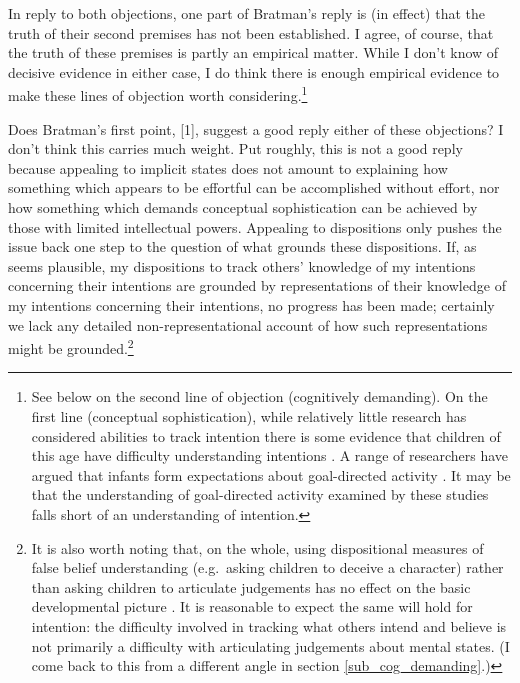 \documentclass[12pt,letterpaper]{extarticle}
\begin{document}
In reply to both objections, one part of Bratman's reply is (in effect) that the truth of their second premises has not been established.
I agree, of course, that the truth of these premises is partly an empirical matter.
While I don't know of decisive evidence in either case, I do think there is enough empirical evidence to make these lines of objection worth considering.\footnote{
See below on the second line of objection (cognitively demanding).
On the first line (conceptual sophistication), while relatively little research has considered abilities to track intention there is some evidence that children of this age have difficulty understanding intentions \citep{Astington:1991jp,Astington:1991kk}.  A range of researchers have argued that infants form expectations about goal-directed activity 
\citep{Csibra:2008pr,Gergely:1995sq,Woodward:1998dm,Woodward:2000jw}.  It may be that the understanding of goal-directed activity examined by these studies falls short of an understanding of intention.
}


Does Bratman's first point, [1], suggest a good reply either of these objections?
I don't think this carries much weight.
Put roughly, this is not a good reply because appealing to implicit states does not amount to explaining how something which appears to be effortful can be accomplished without effort, nor how something which demands conceptual sophistication can be achieved by those with limited intellectual powers. 
Appealing to dispositions only pushes the issue back one step to the question of what grounds these dispositions.
If, as seems plausible, my dispositions to track others' knowledge of my intentions concerning their intentions are grounded by representations of their knowledge of my intentions concerning their intentions, no progress has been made; certainly we lack any detailed non-representational account of how such representations might be grounded.\footnote{
It is also worth noting that, on the whole, using dispositional measures of false belief understanding (e.g.\ asking children to deceive a character) rather than asking children to articulate judgements has no effect on the basic developmental picture
\citep{Wellman:2001lz,Polak:1999xr}.
It is reasonable to expect the same will hold for intention: the difficulty involved in tracking what others intend and believe is not primarily a difficulty with articulating judgements about  mental states.
(I come back to this from a different angle in section \vref{sub_cog_demanding}.)
}
\end{document}
